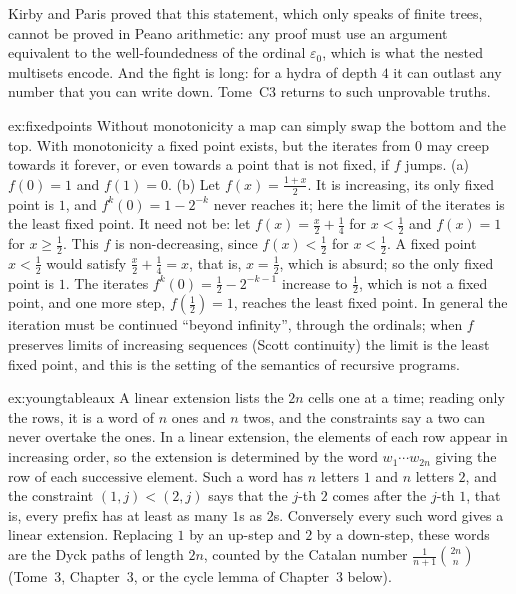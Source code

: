 \begin{remark}
Kirby and Paris proved that this statement, which only speaks of finite trees, cannot be proved in Peano arithmetic: any
proof must use an argument equivalent to the well-foundedness of the ordinal $\varepsilon_0$, which is what the nested multisets
encode. And the fight is long: for a hydra of depth $4$ it can outlast any number that you can write down. Tome~C3 returns
to such unprovable truths.
\end{remark}

\begin{solution}{ex:fixedpoints}
\idea Without monotonicity a map can simply swap the bottom and the top. With monotonicity a fixed point exists, but the
iterates from $0$ may creep towards it forever, or even towards a point that is not fixed, if $f$ jumps.
\writeup (a) $f(0)=1$ and $f(1)=0$. (b) Let $f(x)=\frac{1+x}2$. It is increasing, its only fixed point is $1$, and $f^k(0)=1-2^{-k}$ never reaches
it; here the limit of the iterates is the least fixed point. It need not be: let $f(x)=\frac x2+\frac14$ for $x<\frac12$ and $f(x)=1$ for
$x\ge\frac12$. This $f$ is non-decreasing, since $f(x)<\frac12$ for $x<\frac12$. A fixed point $x<\frac12$ would satisfy $\frac x2+\frac14=x$, that is, $x=\frac12$, which is
absurd; so the only fixed point is $1$. The iterates $f^k(0)=\frac12-2^{-k-1}$ increase to $\frac12$, which is not a fixed point, and one more
step, $f(\frac12)=1$, reaches the least fixed point. In general the iteration must be continued ``beyond infinity'', through the
ordinals; when $f$ preserves limits of increasing sequences (Scott continuity) the limit is the least fixed point, and
this is the setting of the semantics of recursive programs.
\end{solution}

\begin{solution}{ex:youngtableaux}
\idea A linear extension lists the $2n$ cells one at a time; reading only the rows, it is a word of $n$ ones and $n$ twos, and
the constraints say a two can never overtake the ones.
\writeup In a linear extension, the elements of each row appear in increasing order, so the extension is determined by the word
$w_1\cdots w_{2n}$ giving the row of each successive element. Such a word has $n$ letters $1$ and $n$ letters $2$, and the constraint
$(1,j)<(2,j)$ says that the $j$-th $2$ comes after the $j$-th $1$, that is, every prefix has at least as many $1$s as $2$s. Conversely
every such word gives a linear extension. Replacing $1$ by an up-step and $2$ by a down-step, these words are the Dyck paths of
length $2n$, counted by the Catalan number $\frac1{n+1}\binom{2n}n$ (Tome~3, Chapter~3, or the cycle lemma of Chapter~3 below).
\end{solution}


